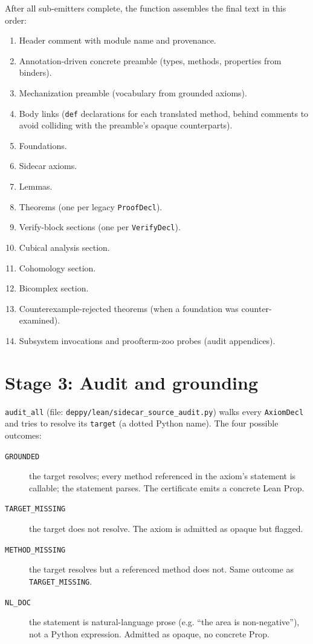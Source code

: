 After all sub-emitters complete, the function assembles the final
\Lean{} text in this order:

\begin{enumerate}[leftmargin=1.7em]
  \item Header comment with module name and provenance.
  \item Annotation-driven concrete preamble (types, methods,
    properties from binders).
  \item Mechanization preamble (vocabulary from grounded axioms).
  \item Body links (\texttt{def} declarations for each translated
    method, behind comments to avoid colliding with the preamble's
    opaque counterparts).
  \item Foundations.
  \item Sidecar axioms.
  \item Lemmas.
  \item Theorems (one per legacy \texttt{ProofDecl}).
  \item Verify-block sections (one per \texttt{VerifyDecl}).
  \item Cubical analysis section.
  \item Cohomology section.
  \item Bicomplex section.
  \item Counterexample-rejected theorems (when a foundation was
    counter-examined).
  \item Subsystem invocations and proofterm-zoo probes
    (audit appendices).
\end{enumerate}

\section{Stage 3: Audit and grounding}
\label{sec:audit}

\texttt{audit\_all} (file:
\texttt{deppy/lean/sidecar\_source\_audit.py}) walks every
\texttt{AxiomDecl} and tries to resolve its \texttt{target} (a
dotted Python name).  The four possible outcomes:

\begin{description}
  \item[\texttt{GROUNDED}] the target resolves; every method
    referenced in the axiom's statement is callable; the statement
    parses.  The certificate emits a concrete Lean Prop.
  \item[\texttt{TARGET\_MISSING}] the target does not resolve.  The
    axiom is admitted as opaque but flagged.
  \item[\texttt{METHOD\_MISSING}] the target resolves but a
    referenced method does not.  Same outcome as
    \texttt{TARGET\_MISSING}.
  \item[\texttt{NL\_DOC}] the statement is natural-language prose
    (e.g. ``the area is non-negative''), not a Python expression.
    Admitted as opaque, no concrete Prop.
\end{description}

